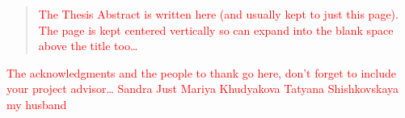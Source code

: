 \documentclass[
12pt, %
oneside, %
english, %
onehalfspacing, %
nolistspacing, %
parskip, %
headsepline, %
]{MastersDoctoralThesis} %
\begin{document}
\cleardoublepage






\begin{abstract}
\textcolor{red}{The Thesis Abstract is written here (and usually kept to just this page). The page is kept centered vertically so can expand into the blank space above the title too\ldots}
\end{abstract}


\begin{acknowledgements}
\addchaptertocentry{\acknowledgementname} %
\textcolor{red}{The acknowledgments and the people to thank go here, don't forget to include your project advisor\ldots}
\textcolor{red}{Sandra Just}
\textcolor{red}{Mariya Khudyakova}
\textcolor{red}{Tatyana Shishkovskaya}
\textcolor{red}{my husband}
\end{acknowledgements}


\tableofcontents %

\listoffigures %

\listoftables %
\end{document}
